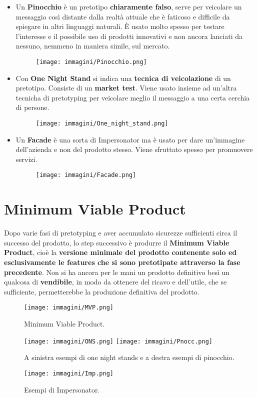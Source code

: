 \begin{itemize}
	      \pagebreak

	\item Un \textbf{Pinocchio} è un pretotipo \textbf{chiaramente falso}, serve per veicolare un messaggio così distante dalla realtà attuale che è faticoso e difficile da spiegare in altri linguaggi naturali. È usato molto spesso per testare l'interesse e il possibile uso di prodotti innovativi e non ancora lanciati da nessuno, nemmeno in maniera simile, sul mercato.

	      \begin{figure}[!h]
		      \centering
		      \texttt{[image: immagini/Pinocchio.png]}
	      \end{figure}

	\item Con \textbf{One Night Stand} si indica una \textbf{tecnica di veicolazione} di un pretotipo. Consiste di un \textbf{market test}.
	      Viene usato insieme ad un'altra tecnicha di pretotyping per veicolare meglio il messaggio a una certa cerchia di persone.

	      \begin{figure}[!h]
		      \centering
		      \texttt{[image: immagini/One\_night\_stand.png]}
	      \end{figure}


	\item Un \textbf{Facade} è una sorta di Impersonator ma è usato per dare un'immagine dell'azienda e non del prodotto stesso. Viene sfruttato spesso per promuovere servizi.

	      \begin{figure}[!h]
		      \centering
		      \texttt{[image: immagini/Facade.png]}
	      \end{figure}

\end{itemize}

\pagebreak

\section{Minimum Viable Product}

Dopo varie fasi di pretotyping e aver accumulato sicurezze sufficienti circa il successo del prodotto, lo step successivo è produrre il \textbf{Minimum Viable Product}, cioè la \textbf{versione minimale del prodotto contenente solo ed esclusivamente le features che si sono pretotipate attraverso la fase precedente}.
Non si ha ancora per le mani un prodotto definitivo besì un qualcosa di \textbf{vendibile}, in modo da ottenere del ricavo e dell'utile, che se sufficiente, permetterebbe la produzione definitiva del prodotto.

\begin{figure}[!h]
	\centering
	\texttt{[image: immagini/MVP.png]}
	\caption{Minimum Viable Product.}
	\texttt{[image: immagini/ONS.png]}
	\texttt{[image: immagini/Pnocc.png]}
	\caption{A sinistra esempi di one night stands e a destra esempi di pinocchio.}
	\texttt{[image: immagini/Imp.png]}
	\caption{Esempi di Impersonator.}
\end{figure}

\pagebreak

